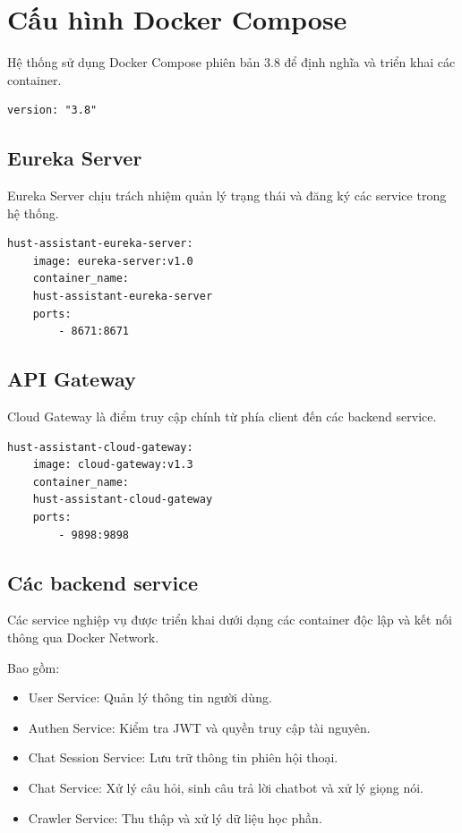 \documentclass[../DoAn.tex]{subfiles}
\begin{document}
\section{Cấu hình Docker Compose}

Hệ thống sử dụng Docker Compose phiên bản 3.8 để định nghĩa và triển khai các container.

\begin{verbatim}
version: "3.8"
\end{verbatim}


\subsection{Eureka Server}

Eureka Server chịu trách nhiệm quản lý trạng thái và đăng ký các service trong hệ thống.

\begin{verbatim}
hust-assistant-eureka-server:
    image: eureka-server:v1.0
    container_name:
    hust-assistant-eureka-server
    ports:
        - 8671:8671
\end{verbatim}



\subsection{API Gateway}

Cloud Gateway là điểm truy cập chính từ phía client đến các backend service.

\begin{verbatim}
hust-assistant-cloud-gateway:
    image: cloud-gateway:v1.3
    container_name:
    hust-assistant-cloud-gateway
    ports:
        - 9898:9898
\end{verbatim}



\subsection{Các backend service}

Các service nghiệp vụ được triển khai dưới dạng các container độc lập và kết nối thông qua Docker Network.

Bao gồm:

\begin{itemize}
    \item User Service: Quản lý thông tin người dùng.
    \item Authen Service: Kiểm tra JWT và quyền truy cập tài nguyên.
    \item Chat Session Service: Lưu trữ thông tin phiên hội thoại.
    \item Chat Service: Xử lý câu hỏi, sinh câu trả lời chatbot và xử lý giọng nói.
    \item Crawler Service: Thu thập và xử lý dữ liệu học phần.
\end{itemize}
\end{document}
